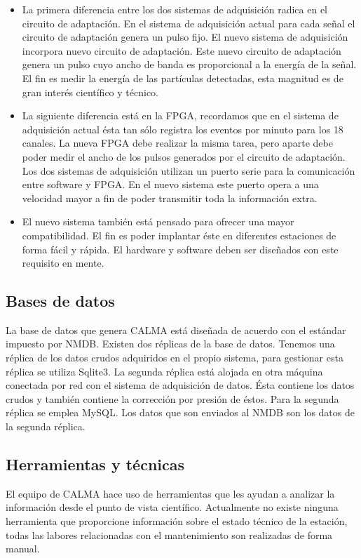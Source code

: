 		\begin{itemize}
			\item La primera diferencia entre los dos sistemas de adquisición radica en el circuito de adaptación. En el sistema de
			  adquisición actual para cada señal el circuito de adaptación genera un pulso fijo. El nuevo sistema de adquisición incorpora
			  nuevo circuito de adaptación. Este nuevo circuito de adaptación genera un pulso cuyo ancho de banda es proporcional a la
			  energía de la señal. El fin es medir la energía de las partículas detectadas, esta magnitud es de gran interés científico y
			  técnico.
			\item La siguiente diferencia está en la FPGA, recordamos que en el sistema de adquisición actual ésta tan sólo registra los
			  eventos por minuto para los 18 canales. La nueva FPGA debe realizar la misma tarea, pero aparte debe poder medir el ancho de
			  los pulsos generados por el circuito de adaptación. Los dos sistemas de adquisición utilizan un puerto serie para la
			  comunicación entre software y FPGA. En el nuevo sistema este puerto opera a una velocidad mayor a fin de poder transmitir
			  toda la información extra.
			\item El nuevo sistema también está pensado para ofrecer una mayor compatibilidad. El fin es poder implantar éste en
			  diferentes estaciones de forma fácil y rápida. El hardware y software deben ser diseñados con este requisito en mente.
		\end{itemize}
	\subsection{Bases de datos}
		La base de datos que genera CALMA está diseñada de acuerdo con el estándar impuesto por NMDB. Existen dos réplicas de la
		base de datos. Tenemos una réplica de los datos crudos adquiridos en el propio sistema, para gestionar esta réplica se utiliza
		Sqlite3. La segunda réplica está alojada en otra máquina conectada por red con el sistema de adquisición de datos. Ésta contiene los datos
		crudos y también contiene la corrección por presión de éstos. Para la segunda réplica se emplea MySQL. Los datos que son enviados
		al NMDB son los datos de la segunda réplica.
	\subsection{Herramientas y técnicas}
		El equipo de CALMA hace uso de herramientas que les ayudan a analizar la información desde el punto de vista científico. Actualmente
		no existe ninguna herramienta que proporcione información sobre el estado técnico de la estación, todas las labores relacionadas con
		el mantenimiento son realizadas de forma manual.

